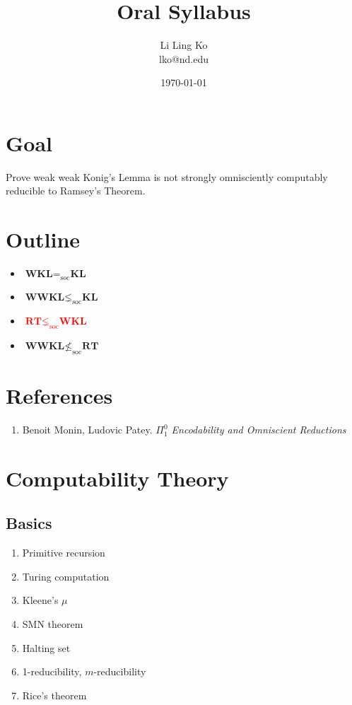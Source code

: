 \documentclass{article}
\newcommand{\MAYBE}[1]{\textcolor{red}{#1}}
\begin{document}
\title{Oral Syllabus}
\author{Li Ling Ko\\ lko@nd.edu}
\date{\today}
\maketitle

\section{Goal}
Prove weak weak Konig's Lemma is not strongly omnisciently computably
reducible to Ramsey's Theorem.

\section{Outline}
\begin{itemize}
  \item $\textbf{WKL} =_{\text{soc}} \textbf{KL}$
  \item $\textbf{WWKL} \lneq_{\text{soc}} \textbf{KL}$
  \item \MAYBE{$\textbf{RT} \lneq_{\text{soc}} \textbf{WKL}$}
  \item $\textbf{WWKL} \nleq_{\text{soc}} \textbf{RT}$
\end{itemize}

\section{References}
\begin{enumerate}
  \item Benoit Monin, Ludovic Patey. \it{$\Pi_1^0$ Encodability and Omniscient
    Reductions}
\end{enumerate}

\section{Computability Theory}
\subsection{Basics}
\begin{enumerate}
  \item Primitive recursion
  \item Turing computation
  \item Kleene's $\mu$
  \item SMN theorem
  \item Halting set
  \item 1-reducibility, $m$-reducibility
  \item Rice's theorem
\end{enumerate}
\end{document}
